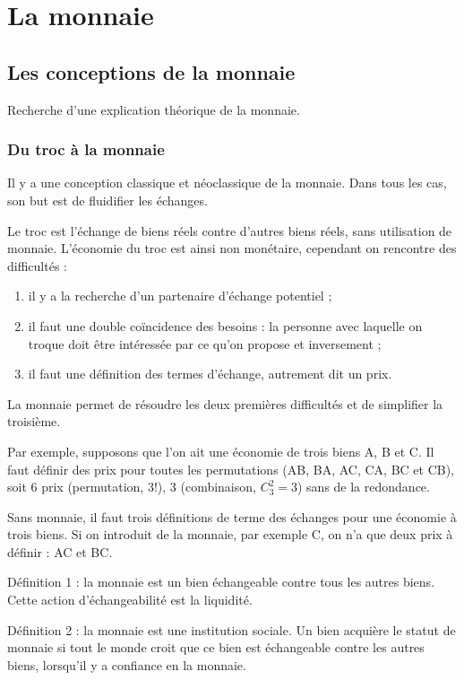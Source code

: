 \chapter{La monnaie}

\section{Les conceptions de la monnaie}

Recherche d'une explication théorique de la monnaie.

	\subsection{Du troc à la monnaie}
	
	Il y a une conception classique et néoclassique de la monnaie. Dans tous les cas, son but est de fluidifier les échanges.
	
	Le troc est l'échange de biens réels contre d'autres biens réels, sans utilisation de monnaie. L'économie du troc est ainsi non monétaire, cependant on rencontre des difficultés :
	
	\begin{enumerate}
		\item il y a la recherche d'un partenaire d'échange potentiel ;
		\item il faut une double coïncidence des besoins : la personne avec laquelle on troque doit être intéressée par ce qu'on propose et inversement ;
		\item il faut une définition des termes d'échange, autrement dit un prix.
	\end{enumerate}
	
	La monnaie permet de résoudre les deux premières difficultés et de simplifier la troisième.
	
	Par exemple, supposons que l'on ait une économie de trois biens A, B et C. Il faut définir des prix pour toutes les permutations (AB, BA, AC, CA, BC et CB), soit 6 prix (permutation, $3!$), 3 (combinaison, $C_3^2 = 3$) sans de la redondance.
	
	Sans monnaie, il faut trois définitions de terme des échanges pour une économie à trois biens. Si on introduit de la monnaie, par exemple C, on n'a que deux prix à définir : AC et BC.
	
	Définition 1 : la monnaie est un bien échangeable contre tous les autres biens. Cette action d'échangeabilité est la liquidité.
	
	Définition 2 : la monnaie est une institution sociale. Un bien acquière le statut de monnaie si tout le monde croit que ce bien est échangeable contre les autres biens, lorsqu'il y a confiance en la monnaie.
	
